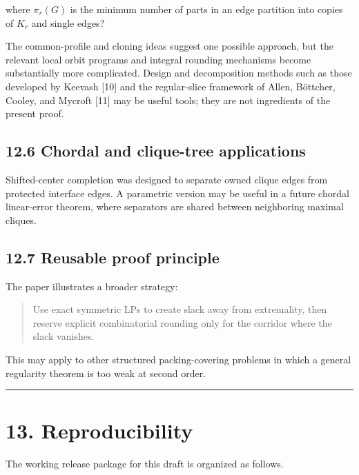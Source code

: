 \documentclass[
  11pt,
]{article}
\begin{document}
where \(\pi_r(G)\) is the minimum number of parts in an edge partition
into copies of \(K_r\) and single edges?

The common-profile and cloning ideas suggest one possible approach, but
the relevant local orbit programs and integral rounding mechanisms
become substantially more complicated. Design and decomposition methods
such as those developed by Keevash {[}10{]} and the regular-slice
framework of Allen, Böttcher, Cooley, and Mycroft {[}11{]} may be useful
tools; they are not ingredients of the present proof.

\subsection{12.6 Chordal and clique-tree
applications}\label{chordal-and-clique-tree-applications}

Shifted-center completion was designed to separate owned clique edges
from protected interface edges. A parametric version may be useful in a
future chordal linear-error theorem, where separators are shared between
neighboring maximal cliques.

\subsection{12.7 Reusable proof
principle}\label{reusable-proof-principle}

The paper illustrates a broader strategy:

\begin{quote}
Use exact symmetric LPs to create slack away from extremality, then
reserve explicit combinatorial rounding only for the corridor where the
slack vanishes.
\end{quote}

This may apply to other structured packing-covering problems in which a
general regularity theorem is too weak at second order.

\begin{center}\rule{0.5\linewidth}{0.5pt}\end{center}

\section{13. Reproducibility}\label{reproducibility}

The working release package for this draft is organized as follows.
\end{document}

